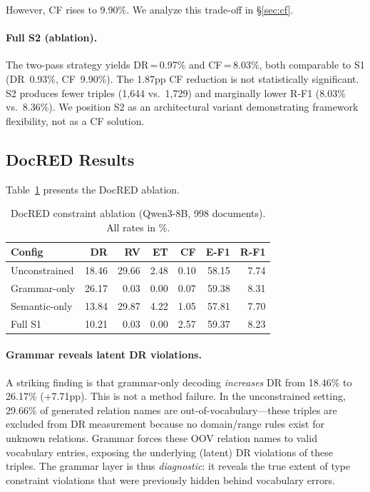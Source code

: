\documentclass[11pt,a4paper]{article}
\begin{document}
However, CF rises to 9.90\%.
We analyze this trade-off in \S\ref{sec:cf}.

\paragraph{Full S2 (ablation).}
The two-pass strategy yields DR\,=\,0.97\% and CF\,=\,8.03\%, both comparable to S1 (DR~0.93\%, CF~9.90\%).
The 1.87pp CF reduction is not statistically significant.
S2 produces fewer triples (1{,}644 vs.\ 1{,}729) and marginally lower R-F1 (8.03\% vs.\ 8.36\%).
We position S2 as an architectural variant demonstrating framework flexibility, not as a CF solution.

\subsection{DocRED Results}
\label{sec:docred_results}

Table~\ref{tab:docred_ablation} presents the DocRED ablation.

\begin{table}[t]
\centering
\caption{DocRED constraint ablation (Qwen3-8B, 998 documents). All rates in \%.}
\label{tab:docred_ablation}
\small
\begin{tabular}{lrrrrrr}
\toprule
\textbf{Config} & \textbf{DR} & \textbf{RV} & \textbf{ET} & \textbf{CF} & \textbf{E-F1} & \textbf{R-F1} \\
\midrule
Unconstrained  & 18.46 & 29.66 & 2.48 & 0.10 & 58.15 & 7.74 \\
Grammar-only   & 26.17 &  0.03 & 0.00 & 0.07 & 59.38 & 8.31 \\
Semantic-only  & 13.84 & 29.87 & 4.22 & 1.05 & 57.81 & 7.70 \\
Full S1        & 10.21 &  0.03 & 0.00 & 2.57 & 59.37 & 8.23 \\
\bottomrule
\end{tabular}
\end{table}

\paragraph{Grammar reveals latent DR violations.}
A striking finding is that grammar-only decoding \emph{increases} DR from 18.46\% to 26.17\% (+7.71pp).
This is not a method failure.
In the unconstrained setting, 29.66\% of generated relation names are out-of-vocabulary---these triples are excluded from DR measurement because no domain/range rules exist for unknown relations.
Grammar forces these OOV relation names to valid vocabulary entries, exposing the underlying (latent) DR violations of these triples.
The grammar layer is thus \emph{diagnostic}: it reveals the true extent of type constraint violations that were previously hidden behind vocabulary errors.
\end{document}
